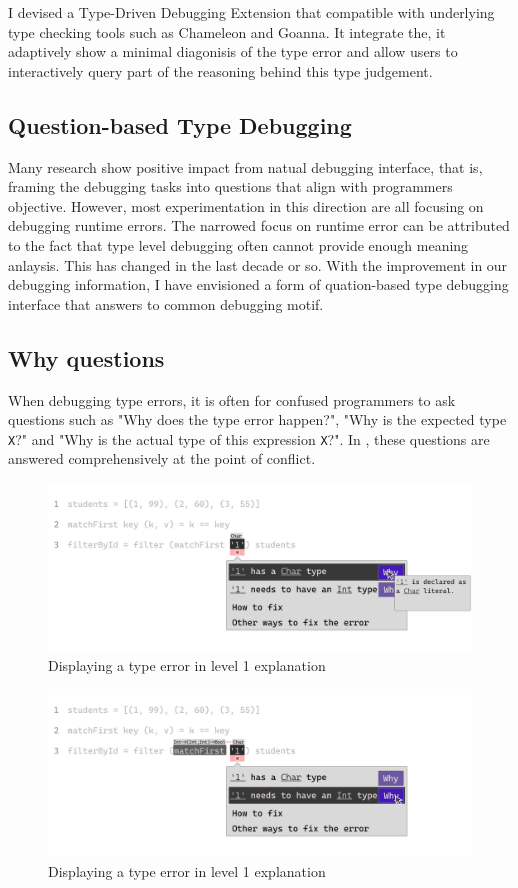 I devised a Type-Driven Debugging Extension that compatible with underlying type checking tools such as Chameleon and Goanna.  It integrate the, it adaptively show a minimal diagonisis of the type error and allow users to interactively query part of the reasoning behind this type judgement.  

\subsection{Question-based Type Debugging}
Many research show positive impact from natual debugging interface, that is,  framing the debugging tasks into questions that align with programmers objective. However, most experimentation in this direction are all focusing on debugging runtime errors. The narrowed focus on runtime error can be attributed to the fact that type level debugging often cannot provide enough meaning anlaysis. This has changed in the last decade or so. With the improvement in our debugging information, I have envisioned a form of quation-based type debugging interface that answers to common debugging motif. 

\subsection{Why questions}
When debugging type errors, it is often for confused programmers to ask questions such as "Why does the type error happen?", "Why is the expected type \texttt{X}?" and "Why is the actual type of this expression \texttt{X}?".  In \toolname{}, these questions are answered comprehensively at the point of conflict. 

\begin{figure}[hbt]
  \includegraphics[width=\linewidth]{ExplainError1.pdf}
  \caption{
      Displaying a type error in level 1 explanation
    }
\end{figure}


\begin{figure}[hbt]
  \includegraphics[width=\linewidth]{ExplainError2.pdf}
  \caption{
      Displaying a type error in level 1 explanation
    }
\end{figure}

